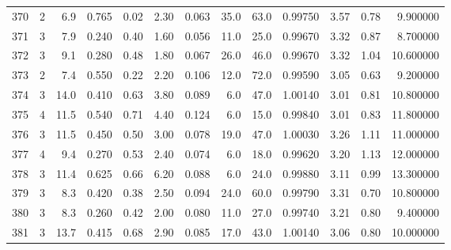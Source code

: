 \begin{tabular}{lrrrrrrrrrrrr}
370  &        2 &            6.9 &             0.765 &         0.02 &            2.30 &      0.063 &                 35.0 &                  63.0 &  0.99750 &  3.57 &       0.78 &   9.900000 \\
371  &        3 &            7.9 &             0.240 &         0.40 &            1.60 &      0.056 &                 11.0 &                  25.0 &  0.99670 &  3.32 &       0.87 &   8.700000 \\
372  &        3 &            9.1 &             0.280 &         0.48 &            1.80 &      0.067 &                 26.0 &                  46.0 &  0.99670 &  3.32 &       1.04 &  10.600000 \\
373  &        2 &            7.4 &             0.550 &         0.22 &            2.20 &      0.106 &                 12.0 &                  72.0 &  0.99590 &  3.05 &       0.63 &   9.200000 \\
374  &        3 &           14.0 &             0.410 &         0.63 &            3.80 &      0.089 &                  6.0 &                  47.0 &  1.00140 &  3.01 &       0.81 &  10.800000 \\
375  &        4 &           11.5 &             0.540 &         0.71 &            4.40 &      0.124 &                  6.0 &                  15.0 &  0.99840 &  3.01 &       0.83 &  11.800000 \\
376  &        3 &           11.5 &             0.450 &         0.50 &            3.00 &      0.078 &                 19.0 &                  47.0 &  1.00030 &  3.26 &       1.11 &  11.000000 \\
377  &        4 &            9.4 &             0.270 &         0.53 &            2.40 &      0.074 &                  6.0 &                  18.0 &  0.99620 &  3.20 &       1.13 &  12.000000 \\
378  &        3 &           11.4 &             0.625 &         0.66 &            6.20 &      0.088 &                  6.0 &                  24.0 &  0.99880 &  3.11 &       0.99 &  13.300000 \\
379  &        3 &            8.3 &             0.420 &         0.38 &            2.50 &      0.094 &                 24.0 &                  60.0 &  0.99790 &  3.31 &       0.70 &  10.800000 \\
380  &        3 &            8.3 &             0.260 &         0.42 &            2.00 &      0.080 &                 11.0 &                  27.0 &  0.99740 &  3.21 &       0.80 &   9.400000 \\
381  &        3 &           13.7 &             0.415 &         0.68 &            2.90 &      0.085 &                 17.0 &                  43.0 &  1.00140 &  3.06 &       0.80 &  10.000000 \\

\end{tabular}
